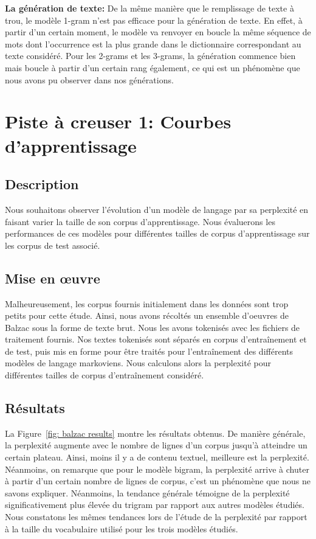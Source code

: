 \documentclass[a4paper]{article}
\begin{document}
\textbf{La génération de texte:}
De la même manière que le remplissage de texte à trou, le modèle 1-gram n'est pas efficace pour la génération de texte. 
En effet, à partir d'un certain moment, le modèle va renvoyer en boucle la même séquence de mots dont l'occurrence est la plus 
grande dans le dictionnaire correspondant au texte considéré. 
Pour les 2-grams et les 3-grams, la génération commence bien mais boucle à partir d'un certain rang également, ce qui est un phénomène que nous avons pu observer dans nos générations.

\section{Piste à creuser 1: Courbes d'apprentissage}

\subsection{Description}
Nous souhaitons observer l'évolution d'un modèle de langage par sa perplexité en faisant varier la taille de son corpus 
d'apprentissage. Nous évaluerons les performances de ces modèles pour différentes tailles de corpus d'apprentissage sur les corpus 
de test associé. 

\subsection{Mise en \oe uvre}
Malheureusement, les corpus fournis initialement dans les données sont trop petits pour cette étude. Ainsi, nous avons récoltés un 
ensemble d'oeuvres de Balzac sous la forme de texte brut. Nous les avons tokenisés avec les fichiers de traitement fournis. 
Nos textes tokenisés sont séparés en corpus d'entraînement et de test, puis mis en forme pour être traités pour l'entraînement des 
différents modèles de langage markoviens.
Nous calculons alors la perplexité pour différentes tailles de corpus d'entraînement considéré. 


\subsection{Résultats}

La Figure~\ref{fig: balzac results} montre les résultats obtenus.
De manière générale, la perplexité augmente avec le  nombre de 
lignes d'un corpus jusqu'à atteindre un certain plateau. Ainsi, moins il y a de contenu textuel, meilleure est la perplexité. 
Néanmoins, on remarque que pour le modèle bigram, la perplexité arrive à chuter à partir d'un certain nombre de lignes de corpus, 
c'est un phénomène que nous ne savons expliquer. Néanmoins, la tendance générale témoigne de la perplexité significativement plus 
élevée du trigram par rapport aux autres modèles étudiés. Nous constatons les mêmes tendances lors de l'étude de la perplexité par 
rapport à la taille du vocabulaire utilisé pour les trois modèles étudiés. 
\end{document}
